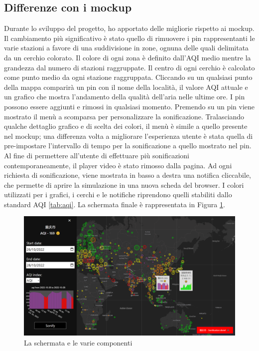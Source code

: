 \subsection{Differenze con i mockup}
Durante lo sviluppo del progetto, ho apportato delle migliorie rispetto ai mockup.
Il cambiamento più significativo è stato quello di rimuovere i pin rappresentanti le varie stazioni a favore di una suddivisione in zone, ognuna delle quali delimitata da un cerchio colorato.
Il colore di ogni zona è definito dall'AQI medio mentre la grandezza dal numero di stazioni raggruppate.
Il centro di ogni cerchio è calcolato come punto medio da ogni stazione raggruppata.
Cliccando su un qualsiasi punto della mappa comparirà un pin con il nome della località, il valore AQI attuale e un grafico che mostra l'andamento della qualità dell'aria nelle ultime ore.
I pin possono essere aggiunti e rimossi in qualsiasi momento.
Premendo su un pin viene mostrato il menù a scomparsa per personalizzare la sonificazione.
Tralasciando qualche dettaglio grafico e di scelta dei colori, il menù è simile a quello presente nel mockup; una differenza volta a migliorare l'esperienza utente è stata quella di pre-impostare l'intervallo di tempo per la sonificazione a quello mostrato nel pin.
Al fine di permettere all'utente di effettuare più sonificazioni contemporaneamente, il player video è stato rimosso dalla pagina.
Ad ogni richiesta di sonificazione, viene mostrata in basso a destra una notifica cliccabile, che permette di aprire la simulazione in una nuova scheda del browser.
I colori utilizzati per i grafici, i cerchi e le notifiche riprendono quelli stabiliti dallo standard AQI \ref{tab:aqi}. La schermata finale è rappresentata in Figura \ref{fig:schermata}.
\begin{figure}[h]
  \includegraphics[width=\linewidth]{img/schermata.png}
  \caption{La schermata e le varie componenti}
  \label{fig:schermata}
\end{figure}
